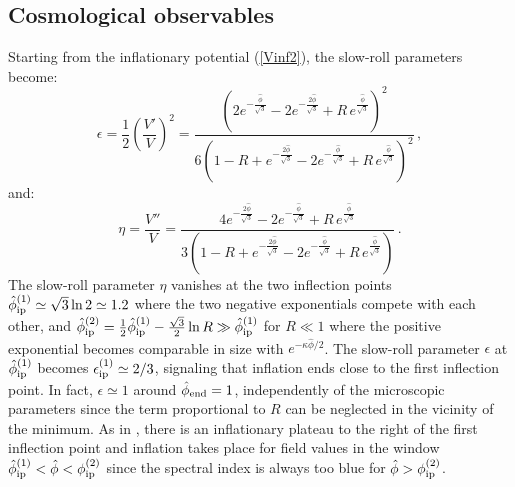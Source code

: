 \documentclass[11pt,a4paper]{article}
\newcommand{\be}{\begin{equation}}
\newcommand{\ee}{\end{equation}}
\begin{document}
\subsection{Cosmological observables}

Starting from the inflationary potential (\ref{Vinf2}), the slow-roll parameters become:
\be
\epsilon = \frac12 \left(\frac{V'}{V}\right)^2 = \frac{\left(2 e^{-\frac{\hat\phi}{\sqrt{3}}}-2 e^{-\frac{2\hat\phi}{\sqrt{3}}}+R\,e^{\frac{\hat\phi}{\sqrt{3}}}\right)^2}	{6 \left(1-R+e^{-\frac{2 \hat\phi}{\sqrt{3}}}-2 e^{-\frac{\hat\phi}{\sqrt{3}}}+R\,e^{\frac{\hat\phi}{\sqrt{3}}}\right)^2}\,,
\label{eps}
\ee
and:
\be
\eta= \frac{V''}{V}=\frac{4 e^{-\frac{2 \hat\phi}{\sqrt{3}}}-2 e^{-\frac{\hat\phi}{\sqrt{3}}}+R\,e^{\frac{\hat\phi}{\sqrt{3}}}}{3\left(1-R+e^{-\frac{2 \hat\phi}{\sqrt{3}}}-2 e^{-\frac{\hat\phi}{\sqrt{3}}}+R\,e^{\frac{\hat\phi}{\sqrt{3}}}\right)}\,.
\label{eta}
\ee
The slow-roll parameter $\eta$ vanishes at the two inflection points $\hat\phi_{\rm ip}^{(1)}\simeq \sqrt{3}\ln 2\simeq 1.2$ where the two negative exponentials compete with each other, and $\hat\phi_{\rm ip}^{(2)}=\frac12 \hat\phi_{\rm ip}^{(1)} - \frac{\sqrt{3}}{2}\ln R\gg \hat\phi_{\rm ip}^{(1)}$ for $R\ll 1$ where the positive exponential becomes comparable in size with $e^{-\kappa\hat\phi/2}$. The slow-roll parameter $\epsilon$ at $\hat\phi_{\rm ip}^{(1)}$ becomes $\epsilon_{\rm ip}^{(1)}\simeq 2/3$, signaling that inflation ends close to the first inflection point. In fact, $\epsilon\simeq 1$ around $\hat\phi_{\rm end}=1$, independently of the microscopic parameters since the term proportional to $R$ can be neglected in the vicinity of the minimum. As in \cite{Cicoli:2008gp}, there is an inflationary plateau to the right of the first inflection point and inflation takes place for field values in the window $\hat\phi_{\rm ip}^{(1)}<\hat\phi<\phi_{\rm ip}^{(2)}$ since the spectral index is always too blue for $\hat\phi>\phi_{\rm ip}^{(2)}$.
\end{document}
